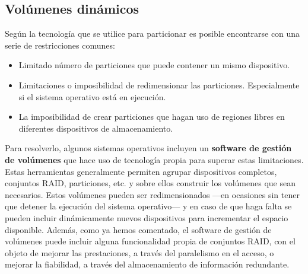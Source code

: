 \subsection{Volúmenes dinámicos}\label{_voluxfamenes_dinuxe1micos}

Según la tecnología que se utilice para particionar es posible
encontrarse con una serie de restricciones comunes:

\begin{itemize}
\item
  Limitado número de particiones que puede contener un mismo
  dispositivo.
\item
  Limitaciones o imposibilidad de redimensionar las particiones.
  Especialmente si el sistema operativo está en ejecución.
\item
  La imposibilidad de crear particiones que hagan uso de regiones libres
  en diferentes dispositivos de almacenamiento.
\end{itemize}

Para resolverlo, algunos sistemas operativos incluyen un
\textbf{software de gestión de volúmenes}{} que hace uso de tecnología
propia para superar estas limitaciones. Estas herramientas generalmente
permiten agrupar dispositivos completos, conjuntos RAID, particiones,
etc. y sobre ellos construir los volúmenes que sean necesarios. Estos
volúmenes pueden ser redimensionados ---en ocasiones sin tener que
detener la ejecución del sistema operativo--- y en caso de que haga
falta se pueden incluir dinámicamente nuevos dispositivos para
incrementar el espacio disponible. Además, como ya hemos comentado, el
software de gestión de volúmenes puede incluir alguna funcionalidad
propia de conjuntos RAID, con el objeto de mejorar las prestaciones, a
través del paralelismo en el acceso, o mejorar la fiabilidad, a través
del almacenamiento de información redundante.
